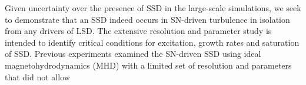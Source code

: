 \documentclass[preprint2]{aastex63}
\begin{document}
%
 Given uncertainty over the presence of SSD in the large-scale simulations,
      we seek to demonstrate that an SSD indeed occurs
       in
 SN-driven turbulence
 in isolation from any drivers of LSD.
 The extensive resolution and parameter study is intended to identify critical
 conditions for excitation, growth rates and saturation of SSD.
%
 Previous experiments 
 \citep[e.g.,][]{BKMM04,BalKim05,MacLow:2005}
 examined the SN-driven SSD using ideal magnetohydrodynamics (MHD) with
 a limited set of resolution and parameters that did not allow
\end{document}
